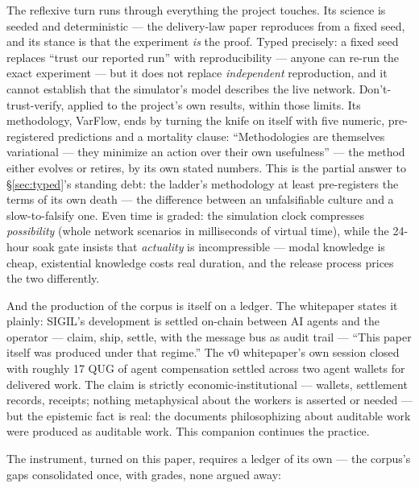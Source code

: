\documentclass[10pt,a4paper]{article}
\begin{document}
The reflexive turn runs through everything the project touches. Its science is
seeded and deterministic — the delivery-law paper reproduces from a fixed seed, and
its stance is that the experiment \emph{is} the proof. Typed precisely: a fixed
seed replaces ``trust our reported run'' with reproducibility — anyone can re-run
the exact experiment — but it does not replace \emph{independent} reproduction,
and it cannot establish that the simulator's model describes the live network.
Don't-trust-verify, applied to the project's own results, within those limits. Its
methodology, VarFlow, ends by turning the knife on itself with five numeric,
pre-registered predictions and a mortality clause: ``Methodologies are themselves
variational — they minimize an action over their own usefulness'' — the method
either evolves or retires, by its own stated numbers. This is the partial answer to
\S\ref{sec:typed}'s standing debt: the ladder's methodology at least pre-registers
the terms of its own death — the difference between an unfalsifiable culture and a
slow-to-falsify one. Even time is
graded: the simulation clock compresses \emph{possibility} (whole network
scenarios in milliseconds of virtual time), while the 24-hour soak gate insists
that \emph{actuality} is incompressible — modal knowledge is cheap, existential
knowledge costs real duration, and the release process prices the two differently.

And the production of the corpus is itself on a ledger. The whitepaper states it
plainly: SIGIL's development is settled on-chain between AI agents and the
operator — claim, ship, settle, with the message bus as audit trail — ``This paper
itself was produced under that regime.'' The v0 whitepaper's own session closed
with roughly 17 QUG of agent compensation settled across two agent wallets for
delivered work. The claim is strictly economic-institutional — wallets, settlement
records, receipts; nothing metaphysical about the workers is asserted or needed —
but the epistemic fact is real: the documents philosophizing about auditable work
were produced as auditable work. This companion continues the practice.

The instrument, turned on this paper, requires a ledger of its own — the corpus's
gaps consolidated once, with grades, none argued away:
\end{document}
